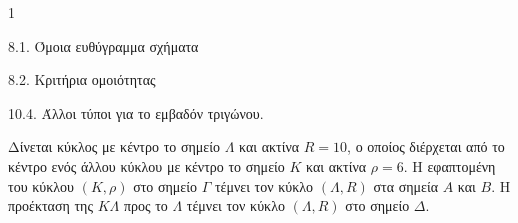 \begin{ylh}{1}
    \item 8.1. Όμοια ευθύγραμμα σχήματα
    \item 8.2. Κριτήρια ομοιότητας
    \item 10.4. Άλλοι τύποι για το εμβαδόν τριγώνου.
\end{ylh}
\begin{figure}
\end{figure}
Δίνεται κύκλος με κέντρο το σημείο $\Lambda$ και ακτίνα $R=10$, ο οποίος διέρχεται από το κέντρο ενός άλλου κύκλου με κέντρο το σημείο $K$ και ακτίνα $\rho=6$. Η εφαπτομένη του κύκλου $(K,\rho)$ στο σημείο $\Gamma$ τέμνει τον κύκλο $(\Lambda,R)$ στα σημεία $A$ και $B$. Η προέκταση της $K\Lambda$ προς το $\Lambda$ τέμνει τον κύκλο $(\Lambda,R)$ στο σημείο $\Delta$.

